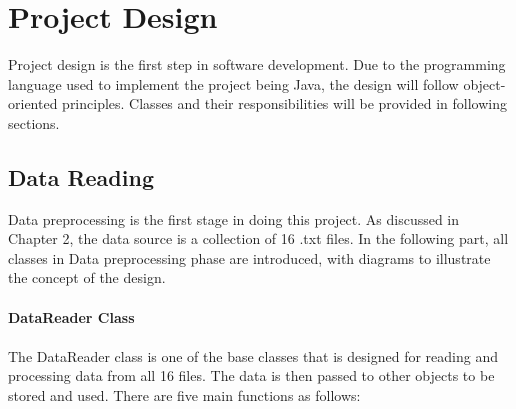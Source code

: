 \clearpage
\section{Project Design}
Project design is the first step in software development. Due to the programming language used to implement the project being Java, the design will follow object-oriented principles. Classes and their responsibilities will be provided in following sections.

\subsection{Data Reading}
Data preprocessing is the first stage in doing this project. As discussed in Chapter 2, the data source is a collection of 16 .txt files. In the following part, all classes in Data preprocessing phase are introduced, with diagrams to illustrate the concept of the design.

\paragraph{DataReader Class}

\paragraph[]{}The DataReader class is one of the base classes that is designed for reading and processing data from all 16 files. The data is then passed to other objects to be stored and used. There are five main functions as follows:

